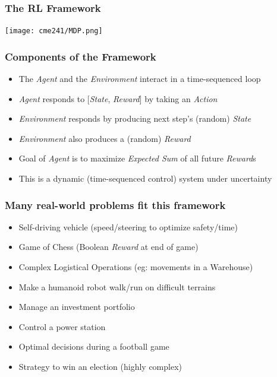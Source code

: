 \documentclass[handout]{beamer}
\begin{document}
\begin{frame}
\frametitle{The RL Framework}
\begin{center}
\texttt{[image: cme241/MDP.png]}
\end{center}
\end{frame}

\begin{frame}
\frametitle{Components of the Framework}
\pause
\begin{itemize}[<+->]
\item The {\em Agent} and the {\em Environment} interact in a time-sequenced loop
\item {\em Agent} responds to [{\em State}, {\em Reward}] by taking an {\em Action}
\item {\em Environment} responds by producing next step's (random) {\em State}
\item {\em Environment} also produces a (random) {\em Reward}
\item Goal of {\em Agent} is to maximize {\em Expected Sum} of all future {\em Reward}s
\item This is a dynamic (time-sequenced control) system under uncertainty
\end{itemize}
\end{frame}

\begin{frame}
\frametitle{Many real-world problems fit this framework}
\pause
\begin{itemize}[<+->]
\item Self-driving vehicle (speed/steering to optimize safety/time)
\item Game of Chess (Boolean {\em Reward} at end of game)
\item Complex Logistical Operations (eg: movements in a Warehouse)
\item Make a humanoid robot walk/run on difficult terrains
\item Manage an investment portfolio
\item Control a power station
\item Optimal decisions during a football game
\item Strategy to win an election (highly complex)
\end{itemize}
\end{frame}
\end{document}
